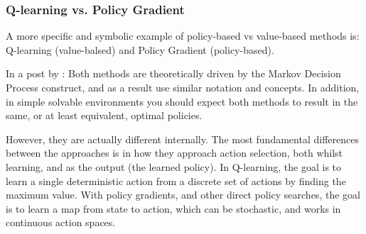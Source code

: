 \documentclass[lang=en,mode=normal,device=normal,color=blue,12pt]{elegantnote}
\DeclareMathOperator*{\1}{\mathbbm{1}}
\begin{document}
\subsubsection{Q-learning vs. Policy Gradient}

A more specific and symbolic example of policy-based vs value-based methods is: Q-learning (value-balsed) and Policy Gradient (policy-based).

In a post by \cite{qlearningvspg}: Both methods are theoretically driven by the Markov Decision Process construct, and as a result use similar notation and concepts. In addition, in simple solvable environments you should expect both methods to result in the same, or at least equivalent, optimal policies.

However, they are actually different internally. The most fundamental differences between the approaches is in how they approach action selection, both whilst learning, and as the output (the learned policy). In Q-learning, the goal is to learn a single deterministic action from a discrete set of actions by finding the maximum value. With policy gradients, and other direct policy searches, the goal is to learn a map from state to action, which can be stochastic, and works in continuous action spaces.
\end{document}
